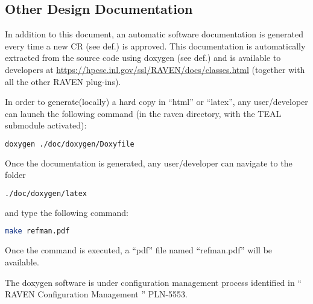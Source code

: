 \subsection{Other Design Documentation}

In addition to this document, an automatic software documentation
is generated every time a new CR (see def.) is approved. This
documentation is automatically extracted from the source code using
doxygen (see def.) and is available to developers at
\url{https://hpcsc.inl.gov/ssl/RAVEN/docs/classes.html} (together with all the other RAVEN plug-ins).

In order to generate(locally) a hard copy in ``html'' or ``latex'', any user/developer can 
launch the 
following command (in the raven directory, with the TEAL submodule activated):
\begin{lstlisting}[language=bash]
doxygen ./doc/doxygen/Doxyfile
\end{lstlisting}
Once the documentation is generated, any user/developer can navigate to the folder
\begin{lstlisting}[language=bash]
./doc/doxygen/latex
\end{lstlisting}
and type the following command:
\begin{lstlisting}[language=bash]
make refman.pdf
\end{lstlisting}
Once the command is executed, a ``pdf'' file named ``refman.pdf'' will be available.

The doxygen software is under configuration management process identified in
`` RAVEN Configuration Management '' PLN-5553.
